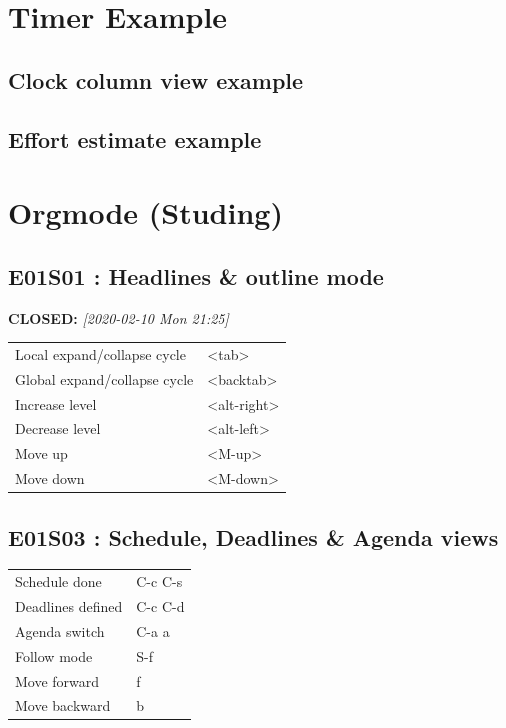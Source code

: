 \documentclass[11pt]{article}
\begin{document}
\section{Timer Example}
\label{sec:orgaeb64cd}

\subsection{Clock column view example}
\label{sec:orgb9baf0d}

\subsection{Effort estimate example}
\label{sec:orga4c27ca}

\section{Orgmode (Studing)}
\label{sec:orge7ac046}
\subsection{E01S01 : Headlines \& outline mode}
\label{sec:org02435ca}
\noindent\textbf{CLOSED:} \textit{[2020-02-10 Mon 21:25]}\\
\begin{center}
\begin{tabular}{ll}
Local expand/collapse cycle &  <tab> \\
Global expand/collapse cycle &  <backtab> \\
Increase level &  <alt-right> \\
Decrease level &  <alt-left> \\
Move up &  <M-up> \\
Move down &  <M-down> \\
\end{tabular}
\end{center}

\subsection{E01S03 : Schedule, Deadlines \& Agenda views}
\label{sec:org7f0411c}
\begin{center}
\begin{tabular}{ll}
Schedule done &  C-c C-s \\
Deadlines defined &  C-c C-d \\
Agenda switch &  C-a a \\
Follow mode &  S-f \\
Move forward &  f \\
Move backward &  b \\
\end{tabular}
\end{center}
\end{document}

